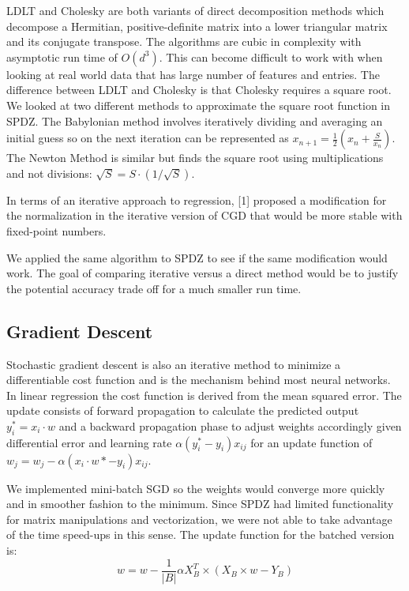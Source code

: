 \documentclass{article}
\begin{document}
LDLT and Cholesky are both variants of direct decomposition methods which decompose a Hermitian, positive-definite matrix into a lower triangular matrix and its conjugate transpose. The algorithms are cubic in complexity with asymptotic run time of $O(d^3)$. This can become difficult to work with when looking at real world data that has large number of features and entries. The difference between LDLT and Cholesky is that Cholesky requires a square root. We looked at two different methods to approximate the square root function in SPDZ. The Babylonian method involves iteratively dividing and averaging an initial guess so on the next iteration can be represented as $x_{n+1} = \frac{1}{2} (x_{n} + \frac{S}{x_{n}})$. The Newton Method is similar but finds the square root using multiplications and not divisions: $\sqrt{S} = S \cdot (1/\sqrt{S})$.

In terms of an iterative approach to regression, [1] proposed a modification for the normalization in the iterative version of CGD that would be more stable with fixed-point numbers. 

We applied the same algorithm to SPDZ to see if the same modification would work. The goal of comparing iterative versus a direct method would be to justify the potential accuracy trade off for a much smaller run time.

\subsection{Gradient Descent}

Stochastic gradient descent is also an iterative method to minimize a differentiable cost function and is the mechanism behind most neural networks. In linear regression the cost function is derived from the mean squared error. The update consists of forward propagation to calculate the predicted output $y_i^* = x_i \cdot w$ and a backward propagation phase to adjust weights accordingly given differential error and learning rate $\alpha(y_i^*-y_i)x_{ij}$ for an update function of $w_j = w_j  - \alpha(x_i \cdot w *-y_i)x_{ij}$.

We implemented mini-batch SGD so the weights would converge more quickly and in smoother fashion to the minimum. Since SPDZ had limited functionality for matrix manipulations and vectorization, we were not able to take advantage of the time speed-ups in this sense. The update function for the batched version is: 
\[
 w = w - \frac{1}{|B|} \alpha X^{T}_{B} \times (X_{B} \times w - Y_{B})
\]
\end{document}
